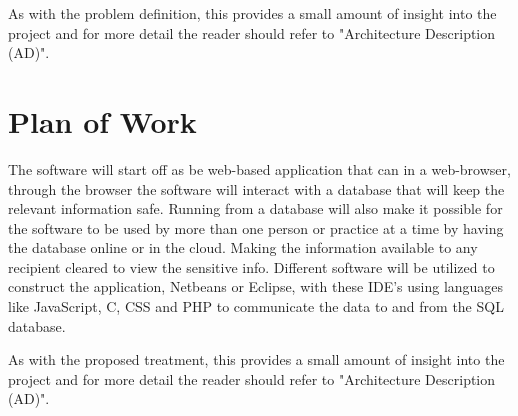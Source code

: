 \documentclass[a4paper]{article}
\begin{document}
As with the problem definition, this provides a small amount of insight into the project and for more detail the reader should refer to "Architecture Description (AD)".
	
\section*{Plan of Work}

The software will start off as be web-based application that can in a web-browser, through the browser the software will interact with a database that will keep the relevant information safe. Running from a database will also make it possible for the software to be used by more than one person or practice at a time by having the database online or in the cloud. Making the information available to any recipient cleared to view the sensitive info. Different software will be utilized to construct the application, Netbeans or Eclipse, with these IDE's using languages like JavaScript, C, CSS and PHP to communicate the data to and from the SQL database.

As with the proposed treatment, this provides a small amount of insight into the project and for more detail the reader should refer to "Architecture Description (AD)".
	
\end{document}
